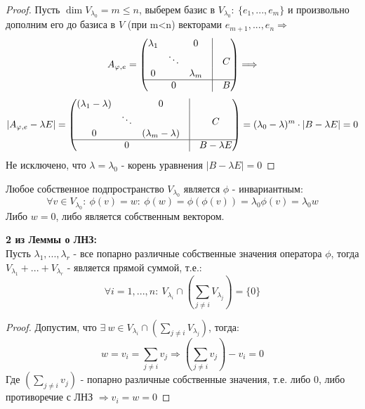     \begin{proof}
        Пусть $\dim V_{\lambda_0} = m \leq n$, выберем базис в $V_{\lambda_0}: \ \{e_1,...,e_m\}$ и произвольно дополним его до базиса в $V$ (при m<n) векторами $e_{m+1},...,e_n \Longrightarrow$
        $$A_{\phi,e} = \begin{pmatrix}
            \lambda_1 & \null & 0 & \vline & \null \\
            \null & \ddots & \null & \vline & C \\
            0 & \null & \lambda_m & \vline & \null \\
            \hline
            \null & 0 & \null & \vline & B
        \end{pmatrix} \Longrightarrow $$
        $$|A_{\phi,e} - \lambda E| = \begin{pmatrix}
            (\lambda_1 - \lambda) & \null & 0 & \vline & \null \\
            \null & \ddots & \null & \vline & C \\
            0 & \null & (\lambda_m - \lambda) & \vline & \null \\
            \hline
            \null & 0 & \null & \vline & B - \lambda E
        \end{pmatrix} = (\lambda_0-\lambda)^m\cdot |B-\lambda E|=0$$
        Не исключено, что $\lambda = \lambda_0$ - корень уравнения $|B-\lambda E| =0 $       
    \end{proof} 
    \begin{remark}
        Любое собственное подпространство $V_{\lambda_0}$ является $\phi$ - инвариантным:
        $$\forall v \in V_{\lambda_0}: \ \phi(v) = w: \ \phi(w) = \phi(\phi(v)) = \lambda_0 \phi(v) = \lambda_0 w$$
        Либо $w=0$, либо является собственным вектором.   
    \end{remark}
    \begin{consequense} \textbf{2 из Леммы о ЛНЗ:} \\
        Пусть $\lambda_1,...,\lambda_r$ - все попарно различные собственные значения оператора $\phi$, тогда $V_{\lambda_1} + ... + V_{\lambda_r}$ - является прямой суммой, т.е.:
        $$\forall i = 1,...,n: \  V_{\lambda_i} \cap (\sum \limits_{j\neq i}V_{\lambda_j}) = \{0\}$$   
    \end{consequense}
    \begin{proof}
        Допустим, что $\exists \ w \in V_{\lambda_i} \cap (\sum \limits_{j\neq i}V_{\lambda_j})$, тогда: 
        $$w = v_i = \sum \limits_{j\neq i}v_j \Longrightarrow (\sum \limits_{j\neq i}v_j) - v_i = 0$$
        Где $(\sum \limits_{j\neq i}v_j)$ - попарно различные собственные значения, т.е. либо $0$, либо противоречие с ЛНЗ $\Longrightarrow v_i = w = 0$    
    \end{proof}
